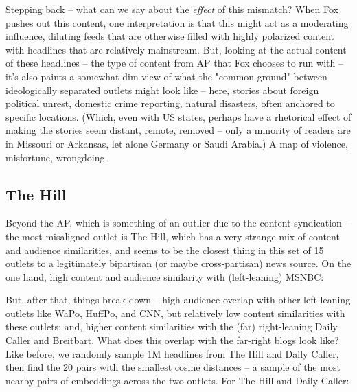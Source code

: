 \documentclass{scrartcl}
\begin{document}
Stepping back -- what can we say about the \textit{effect} of this mismatch? When Fox pushes out this content, one interpretation is that this might act as a moderating influence, diluting feeds that are otherwise filled with highly polarized content with headlines that are relatively mainstream. But, looking at the actual content of these headlines -- the type of content from AP that Fox chooses to run with -- it's also paints a somewhat dim view of what the "common ground" between ideologically separated outlets might look like -- here, stories about foreign political unrest, domestic crime reporting, natural disasters, often anchored to specific locations. (Which, even with US states, perhaps have a rhetorical effect of making the stories seem distant, remote, removed -- only a minority of readers are in Missouri or Arkansas, let alone Germany or Saudi Arabia.) A map of violence, misfortune, wrongdoing.

\subsection{The Hill}

Beyond the AP, which is something of an outlier due to the content syndication -- the most misaligned outlet is The Hill, which has a very strange mix of content and audience similarities, and seems to be the closest thing in this set of 15 outlets to a legitimately bipartisan (or maybe cross-partisan) news source. On the one hand, high content and audience similarity with (left-leaning) MSNBC:


But, after that, things break down -- high audience overlap with other left-leaning outlets like WaPo, HuffPo, and CNN, but relatively low content similarities with these outlets; and, higher content similarities with the (far) right-leaning Daily Caller and Breitbart. What does this overlap with the far-right blogs look like? Like before, we randomly sample 1M headlines from The Hill and Daily Caller, then find the 20 pairs with the smallest cosine distances -- a sample of the most nearby pairs of embeddings across the two outlets. For The Hill and Daily Caller:
\end{document}
